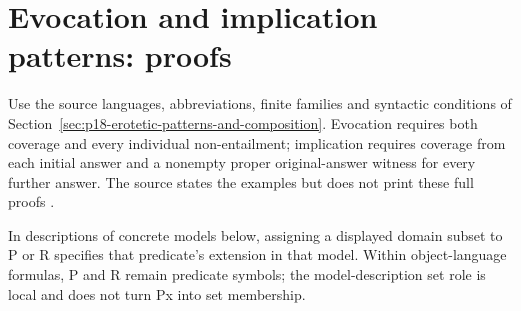 \section{Evocation and implication patterns: proofs}
\label{sec:p18-erotetic-patterns-proofs}

Use the source languages, abbreviations, finite families and syntactic
conditions of Section~\ref{sec:p18-erotetic-patterns-and-composition}.
Evocation requires both coverage and every individual non-entailment;
implication requires coverage from each initial answer and a nonempty
proper original-answer witness for every further answer. The source states
the examples but does not print these full proofs
\cite[secs.~6,8]{Wisniewski2001QuestionsInferences}.

In descriptions of concrete models below, assigning a displayed domain subset
to P or R specifies that predicate's extension in that model.
Within object-language formulas, P and R remain predicate symbols;
the model-description set role is local and does not turn Px into set membership.

